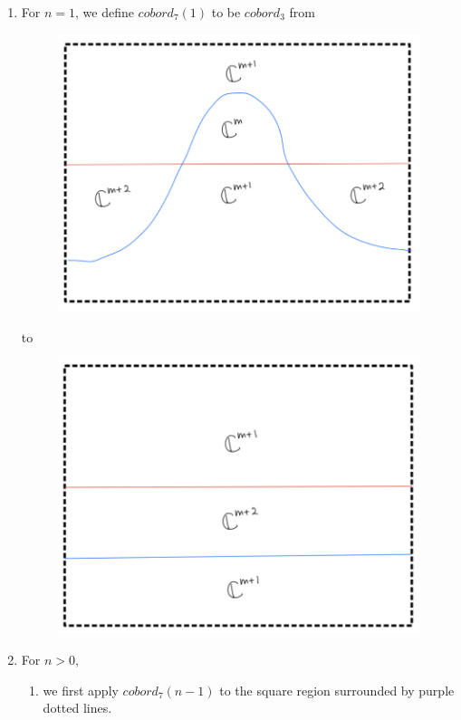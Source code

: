 \begin{enumerate}[label=(\roman*)]
\item For $n=1$, we define $cobord_7(1)$ to be $cobord_3$ from
\begin{figure}[H]
    \centering
    \includegraphics[scale = 0.75]{diagrams/cobord7/2.png}
    \caption{}
    \label{fig:your-label}
\end{figure}
to
\begin{figure}[H]
    \centering
    \includegraphics[scale = 0.75]{diagrams/cobord7/3.png}
    \caption{}
    \label{fig:your-label}
\end{figure}
\pagebreak 
\item For $n>0$,
\begin{enumerate}[label=(Step \arabic*)]
\item we first apply $cobord_7(n-1)$ to the square region surrounded by purple dotted lines.


\end{enumerate}
\end{enumerate}
